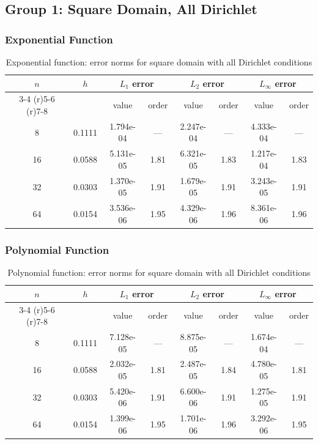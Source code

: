 \documentclass[12pt,a4paper]{article}
\begin{document}
\subsection{Group 1: Square Domain, All Dirichlet}

\subsubsection{Exponential Function}
\begin{table}[H]
\centering
\caption{Exponential function: error norms for square domain with all Dirichlet conditions}
\begin{tabular}{cccccccc}
\toprule
$n$ & $h$ & \multicolumn{2}{c}{$L_1$ error} & \multicolumn{2}{c}{$L_2$ error} & \multicolumn{2}{c}{$L_\infty$ error} \\
\cmidrule(r){3-4} \cmidrule(r){5-6} \cmidrule(r){7-8}
& & value & order & value & order & value & order \\
\midrule
8  & 0.1111 & 1.794e-04 & --- & 2.247e-04 & --- & 4.333e-04 & --- \\
16 & 0.0588 & 5.131e-05 & 1.81 & 6.321e-05 & 1.83 & 1.217e-04 & 1.83 \\
32 & 0.0303 & 1.370e-05 & 1.91 & 1.679e-05 & 1.91 & 3.243e-05 & 1.91 \\
64 & 0.0154 & 3.536e-06 & 1.95 & 4.329e-06 & 1.96 & 8.361e-06 & 1.96 \\
\bottomrule
\end{tabular}
\end{table}

\subsubsection{Polynomial Function}
\begin{table}[H]
\centering
\caption{Polynomial function: error norms for square domain with all Dirichlet conditions}
\begin{tabular}{cccccccc}
\toprule
$n$ & $h$ & \multicolumn{2}{c}{$L_1$ error} & \multicolumn{2}{c}{$L_2$ error} & \multicolumn{2}{c}{$L_\infty$ error} \\
\cmidrule(r){3-4} \cmidrule(r){5-6} \cmidrule(r){7-8}
& & value & order & value & order & value & order \\
\midrule
8  & 0.1111 & 7.128e-05 & --- & 8.875e-05 & --- & 1.674e-04 & --- \\
16 & 0.0588 & 2.032e-05 & 1.81 & 2.487e-05 & 1.84 & 4.780e-05 & 1.81 \\
32 & 0.0303 & 5.420e-06 & 1.91 & 6.600e-06 & 1.91 & 1.275e-05 & 1.91 \\
64 & 0.0154 & 1.399e-06 & 1.95 & 1.701e-06 & 1.96 & 3.292e-06 & 1.95 \\
\bottomrule
\end{tabular}
\end{table}
\end{document}
